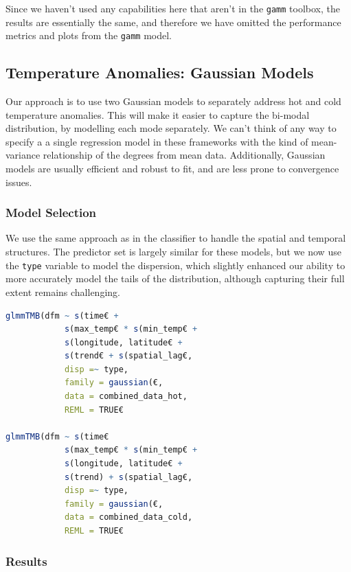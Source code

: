 \documentclass[12pt, twoside,hidelinks]{article}
\theoremstyle{definition}
\numberwithin{equation}{section}
\begin{document}
Since we haven't used any capabilities here that aren't in the \texttt{gamm} toolbox, the results are essentially the same, and therefore we have omitted the performance metrics and plots from the \texttt{gamm} model.

\subsection{Temperature Anomalies: Gaussian Models}\label{sec:analysis:degrees_from_mean}

Our approach is to use two Gaussian models to separately address hot and cold temperature anomalies. This will make it easier to capture the bi-modal distribution, by modelling each mode separately. We can't think of any way to specify a a single regression model in these frameworks with the kind of mean-variance relationship of the degrees from mean data. Additionally, Gaussian models are usually efficient and robust to fit, and are less prone to convergence issues. 

\subsubsection{Model Selection}

We use the same approach as in the classifier to handle the spatial and temporal structures. The predictor set is largely similar for these models, but we now use the \texttt{type} variable to model the dispersion, which slightly enhanced our ability to more accurately model the tails of the distribution, although capturing their full extent remains challenging. 

\begin{lstlisting}[language=R]
glmmTMB(dfm ~ s(time€ + 
            s(max_temp€ * s(min_temp€ +
            s(longitude, latitude€ +
            s(trend€ + s(spatial_lag€,
            disp =~ type,
            family = gaussian(€,
            data = combined_data_hot,
            REML = TRUE€

glmmTMB(dfm ~ s(time€
            s(max_temp€ * s(min_temp€ +
            s(longitude, latitude€ +
            s(trend) + s(spatial_lag€,
            disp =~ type,
            family = gaussian(€,
            data = combined_data_cold,
            REML = TRUE€
\end{lstlisting}

\subsubsection{Results}
\end{document}
